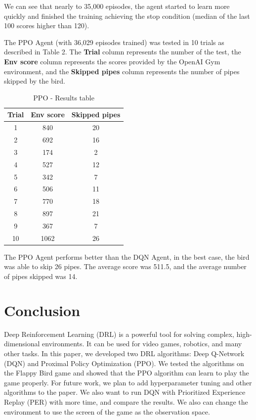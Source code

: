 \documentclass[letterpaper]{article}
\begin{document}
We can see that nearly to 35,000 episodes, the agent started to learn more quickly and finished the training achieving the stop condition (median of the last 100 scores higher than 120).

The PPO Agent (with 36,029 episodes trained) was tested in 10 trials as described in Table 2. The \textbf{Trial} column represents the number of the test, the \textbf{Env score} column represents the scores provided by the OpenAI Gym environment, and the \textbf{Skipped pipes} column represents the number of pipes skipped by the bird.

\begin{table}[h]
    \centering
    \begin{tabular}{|c||c|c|}
    \hline
    Trial & Env score & Skipped pipes \\
    \hline
    1 & 840 & 20 \\
    \hline
    2 & 692 & 16 \\
    \hline
    3 & 174 & 2 \\
    \hline
    4 & 527 & 12 \\
    \hline
    5 & 342 & 7 \\
    \hline
    6 & 506 & 11 \\
    \hline
    7 & 770 & 18 \\
    \hline
    8 & 897 & 21 \\
    \hline
    9 & 367 & 7 \\
    \hline
    10 & 1062 & 26 \\
    \hline
    \end{tabular}
    \caption{PPO - Results table}
    \label{tab:ppo_table}
\end{table}

The PPO Agent performs better than the DQN Agent, in the best case, the bird was able to skip 26 pipes. The average score was 511.5, and the average number of pipes skipped was 14.

\section{Conclusion}

Deep Reinforcement Learning (DRL) is a powerful tool for solving complex, high-dimensional environments. It can be used for video games, robotics, and many other tasks. In this paper, we developed two DRL algorithms: Deep Q-Network (DQN) and Proximal Policy Optimization (PPO). We tested the algorithms on the Flappy Bird game and showed that the PPO algorithm can learn to play the game properly. For future work, we plan to add hyperparameter tuning and other algorithms to the paper. We also want to run DQN with Prioritized Experience Replay (PER) with more time, and compare the results. We also can change the environment to use the screen of the game as the observation space.



\end{document}
